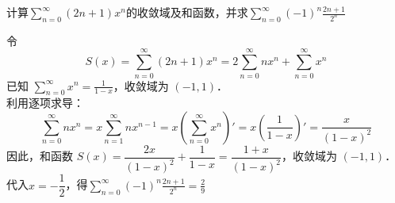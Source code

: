 \documentclass[12pt, a4paper, oneside, UTF8]{ctexbook}
\begin{document}
\begin{example}
    计算$\displaystyle\sum_{n=0}^{\infty}(2n+1)x^n$的收敛域及和函数，并求$\displaystyle\sum_{n=0}^{\infty}(-1)^n\frac{2n+1}{2^n}$
\end{example}
\begin{solution}
    令 \[S(x) = \sum_{n=0}^\infty (2n+1)x^n = 2\sum_{n=0}^\infty nx^n + \sum_{n=0}^\infty x^n\]
    已知 $\displaystyle\sum_{n=0}^\infty x^n = \frac{1}{1-x}$，收敛域为 $(-1, 1)$．\\
    利用逐项求导：\[\sum_{n=0}^\infty nx^n = x \sum_{n=1}^\infty nx^{n-1} = x \left(\sum_{n=0}^\infty x^n\right)' = x \left(\frac{1}{1-x}\right)' = \frac{x}{(1-x)^2}\]
    因此，和函数 $S(x) = \dfrac{2x}{(1-x)^2} + \dfrac{1}{1-x} = \boxed{\dfrac{1+x}{(1-x)^2}}$，收敛域为 $\boxed{(-1, 1)}$．\\
    代入$x=-\dfrac{1}{2}$，得$\displaystyle\sum_{n=0}^{\infty}(-1)^n\frac{2n+1}{2^n}=\boxed{\frac{2}{9}}$
\end{solution}
\end{document}

